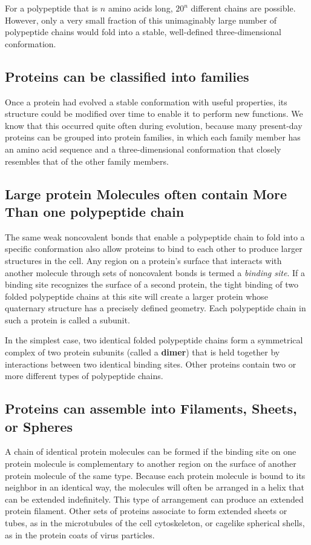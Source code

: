 For a polypeptide that is $n$ amino acids long, $20^n$ different chains are possible.
However, only a very small fraction of this unimaginably large number
of polypeptide chains would fold into a stable, well-defined three-dimensional conformation.

\subsection{Proteins can be classified into families}

Once a protein had evolved a stable conformation with useful properties,
its structure could be modified over time to enable it to perform
new functions. We know that this occurred quite often during evolution,
because many present-day proteins can be grouped into protein families,
in which each family member has an amino acid sequence and a
three-dimensional conformation that closely resembles that of the other
family members.

\subsection{Large protein Molecules often contain More Than one polypeptide chain}

The same weak noncovalent bonds that enable a polypeptide chain to
fold into a specific conformation also allow proteins to bind to each other
to produce larger structures in the cell. Any region on a protein’s surface
that interacts with another molecule through sets of noncovalent bonds
is termed a \textit{binding site}.
If a binding site recognizes the surface
of a second protein, the tight binding of two folded polypeptide chains
at this site will create a larger protein whose quaternary structure has a
precisely defined geometry. Each polypeptide chain in such a protein is
called a subunit.

In the simplest case, two identical folded polypeptide chains form a symmetrical
complex of two protein subunits (called a \textbf{dimer}) that is held
together by interactions between two identical binding sites.
Other proteins contain two or more different types of polypeptide chains.

\subsection{Proteins can assemble into Filaments, Sheets, or Spheres}

A chain of identical protein molecules can be formed if the
binding site on one protein molecule is complementary to another region
on the surface of another protein molecule of the same type. Because
each protein molecule is bound to its neighbor in an identical way, the
molecules will often be arranged in a helix that can be extended indefinitely.
This type of arrangement can produce an extended protein filament.
Other sets of proteins associate to form extended sheets or tubes,
as in the microtubules of the cell cytoskeleton, or cagelike spherical shells,
as in the protein coats of virus particles.

